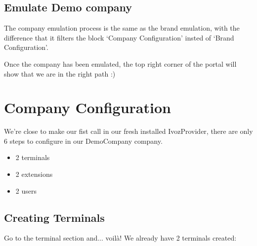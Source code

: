 \documentclass[letterpaper,10pt,english]{sphinxmanual}
\begin{document}
\subsection{Emulate Demo company}
\label{internal_calls/brand_portal:emulate-company}\label{internal_calls/brand_portal:emulate-demo-company}
The company emulation process is the same as the brand emulation, with the
difference that it filters the block ‘Company Configuration’ insted of
‘Brand Configuration’.



Once the company has been emulated, the top right corner of the portal will
show that we are in the right path :)



\section{Company Configuration}
\label{internal_calls/company_portal:company-configuration}\label{internal_calls/company_portal::doc}
We're close to make our fist call in our fresh installed IvozProvider, there
are only 6 steps to configure in our DemoCompany company.
\begin{itemize}
\item {} 
2 terminals

\item {} 
2 extensions

\item {} 
2 users

\end{itemize}


\subsection{Creating Terminals}
\label{internal_calls/company_portal:creating-terminals}
Go to the terminal section and... voilà! We already have 2 terminals created:

\noindent{}
\end{document}
